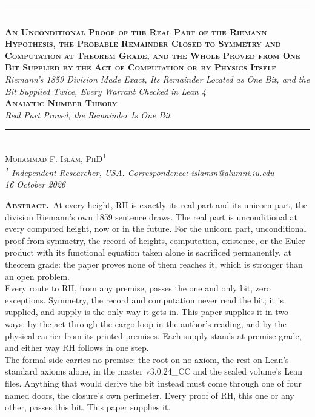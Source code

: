 \documentclass[10pt]{article}
\begin{document}
\thispagestyle{fancy}
\begin{center}
{\color{accent}\rule{0.6\textwidth}{0.8pt}}\\[10pt]
{\bfseries\scshape\fontsize{19}{23}\selectfont An Unconditional Proof of
the Real Part of the Riemann Hypothesis, the Probable Remainder Closed
to Symmetry and Computation at Theorem Grade, and the Whole Proved from
One Bit Supplied by the Act of Computation or by Physics Itself}\\[8pt]
{\itshape\large Riemann's 1859 Division Made Exact, Its Remainder
Located as One Bit, and the Bit Supplied Twice, Every Warrant Checked in
Lean 4}\\[8pt]
{\footnotesize\color{accent}\scshape\bfseries Analytic Number
Theory}\\[3pt]
{\itshape\color{deep}\small Real Part Proved; the Remainder Is One
Bit}\\[9pt]
{\color{accent}\rule{0.6\textwidth}{0.8pt}}\\[10pt]
{\scshape Mohammad F. Islam, PhD\textsuperscript{1}}\\[2pt]
{\itshape\color{faint}\small \textsuperscript{1} Independent Researcher,
USA. Correspondence: islamm@alumni.iu.edu}\\[2pt]
{\itshape\color{faint}\small 16 October 2026}\\[12pt]
\end{center}
\noindent{\color{accent}\rule{\textwidth}{0.6pt}}\par\vspace{4pt}
{\small\setlength{\parindent}{1em}\noindent\textbf{\scshape\color{deep}Abstract.}\ At
every height, RH is exactly its real part and its unicorn part, the
division Riemann's own 1859 sentence draws. The real part is
unconditional at every computed height, now or in the future. For the
unicorn part, unconditional proof from symmetry, the record of heights,
computation, existence, or the Euler product with its functional
equation taken alone is sacrificed permanently, at theorem grade: the
paper proves none of them reaches it, which is stronger than an open
problem.\\
Every route to RH, from any premise, passes the one and only bit, zero
exceptions. Symmetry, the record and computation never read the bit; it
is supplied, and supply is the only way it gets in. This paper supplies
it in two ways: by the act through the cargo loop in the author's
reading, and by the physical carrier from its printed premises. Each
supply stands at premise grade, and either way RH follows in one step.\\
The formal side carries no premise: the root on no axiom, the rest on
Lean's standard axioms alone, in the master v3.0.24\_CC and the sealed
volume's Lean files. Anything that would derive the bit instead must
come through one of four named doors, the closure's own perimeter. Every
proof of RH, this one or any other, passes this bit. This paper supplies
it.\par}
\end{document}
